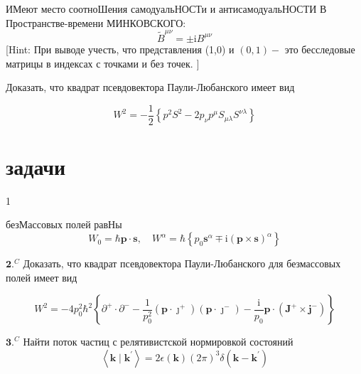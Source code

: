 \documentclass[a4paper,12pt]{article} %
\begin{document}
\begin{task}

ИМеют место соотноШения самодуальНОСТи и антисамодуальНОСТИ В Пространстве-времени МИНКОВСКОГО:
$$
\tilde{B}^{\mu \nu}=\pm \mathrm{i} B^{\mu \nu}
$$
[Hint: При выводе учесть, что представления (1,0) и $(0,1)-$ это бесследовые матрицы в индексах с точками и без точек. $]$


\end{task}



\begin{task}

Доказать, что квадрат псевдовектора Паули-Любанского имеет вид

$$
W^{2}=-\frac{1}{2}\left\{p^{2} S^{2}-2 p_{\nu} p^{\mu} S_{\mu \lambda} S^{\nu \lambda}\right\}
$$


\end{task}


\section{задачи}



\begin{task}
1

безМассовых полей равНы
$$
W_{0}=\hbar \boldsymbol{p} \cdot \boldsymbol{s}, \quad W^{\alpha}=\hbar\left\{p_{0} \boldsymbol{s}^{\alpha} \mp \mathrm{i}(\boldsymbol{p} \times \boldsymbol{s})^{\alpha}\right\}
$$


\end{task}



\begin{task}
$\mathbf{2 .}^{C}$ Доказать, что квадрат псевдовектора Паули-Любанского для безмассовых полей имеет вид

$$
W^{2}=-4 p_{0}^{2} \hbar^{2}\left\{\partial^{+} \cdot \partial^{-}-\frac{1}{p_{0}^{2}}\left(\boldsymbol{p} \cdot \boldsymbol{\jmath}^{+}\right)\left(\boldsymbol{p} \cdot \boldsymbol{\jmath}^{-}\right)-\frac{\mathrm{i}}{p_{0}} \boldsymbol{p} \cdot\left(\boldsymbol{J}^{+} \times \boldsymbol{j}^{-}\right)\right\}$$

\end{task}



\begin{task}

$\mathbf{3 .}^{C}$ Найти поток частиц с релятивистской нормировкой состояний
$$
\left\langle\boldsymbol{k} \mid \boldsymbol{k}^{\prime}\right\rangle=2 \epsilon(\boldsymbol{k})(2 \pi)^{3} \delta\left(\boldsymbol{k}-\boldsymbol{k}^{\prime}\right)
$$


\end{task}
\end{document}
